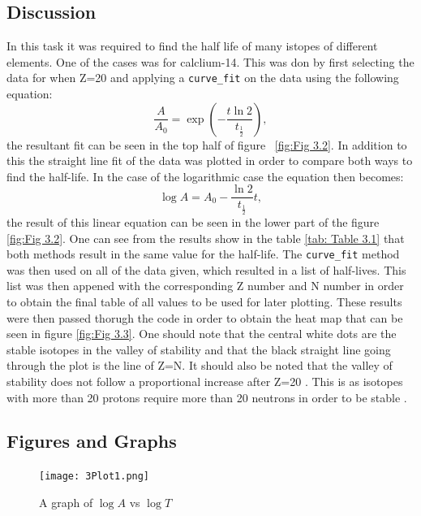 \documentclass[12pt, a4paper]{article}
\begin{document}
\subsection{Discussion}
In this task it was required to find the half life of many istopes of different elements. One of the cases was for calclium-14. This was don by first selecting the data for when Z=20 and applying a \texttt{curve_fit} on the data using the following equation:
\begin{equation}
    \frac{A}{A_0} = \exp\left(-\frac{t\ln2}{t_\frac{1}{2}}\right) ,
\end{equation}
the resultant fit can be seen in the top half of figure
~\ref{fig:Fig 3.2}. In addition to this the straight line fit of the data was plotted in order to compare both ways to find the half-life. In the case of the logarithmic case the equation then becomes:
\begin{equation}
    \log{A} = A_0-\frac{\ln2}{t_{\frac{1}{2}}}t ,
\end{equation}
the result of this linear equation can be seen in the lower part of the figure \ref{fig:Fig 3.2}. One can see from the results show in the table \ref{tab: Table 3.1} that both methods result in the same value for the half-life. The \texttt{curve_fit} method was then used on all of the data given, which resulted in a list of half-lives. This list was then appened with the corresponding Z number and N number in order to obtain the final table of all values to be used for later plotting. These results were then passed thorugh the code in order to obtain the heat map that can be seen in figure \ref{fig:Fig 3.3}. One should note that the central white dots are the stable isotopes in the valley of stability \parencite{macintosh2001m} and that the black straight line going through the plot is the line of Z=N. It should also be noted that the valley of stability does not follow a proportional increase after Z=20 \parencite{boutin2002climbing}. This is as isotopes with more than 20 protons require more than 20 neutrons in order to be stable \parencite{macintosh2001m}.

\subsection{Figures and Graphs}
\begin{figure}[H]
    \centering
    \texttt{[image: 3Plot1.png]}
    \caption{A graph of \(\log{A}\) vs \(\log{T}\)}
    \label{fig:Fig 3.1}
\end{figure}
\end{document}
